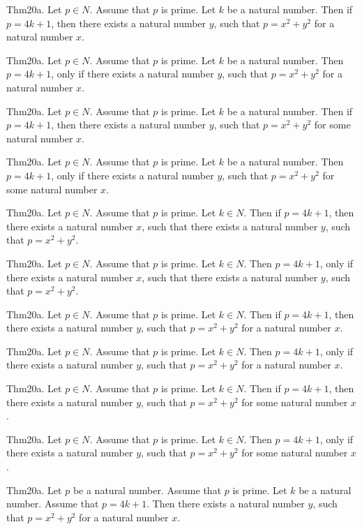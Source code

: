 \documentclass{article}
\begin{document}
Thm20a. Let $p \in N$. Assume that $p$ is prime. Let $k$ be a natural number. Then if $p = 4 k + 1$, then there exists a natural number $y$, such that $p = x ^{ 2}+ y ^{ 2}$ for a natural number $x$.

Thm20a. Let $p \in N$. Assume that $p$ is prime. Let $k$ be a natural number. Then $p = 4 k + 1$, only if there exists a natural number $y$, such that $p = x ^{ 2}+ y ^{ 2}$ for a natural number $x$.

Thm20a. Let $p \in N$. Assume that $p$ is prime. Let $k$ be a natural number. Then if $p = 4 k + 1$, then there exists a natural number $y$, such that $p = x ^{ 2}+ y ^{ 2}$ for some natural number $x$.

Thm20a. Let $p \in N$. Assume that $p$ is prime. Let $k$ be a natural number. Then $p = 4 k + 1$, only if there exists a natural number $y$, such that $p = x ^{ 2}+ y ^{ 2}$ for some natural number $x$.

Thm20a. Let $p \in N$. Assume that $p$ is prime. Let $k \in N$. Then if $p = 4 k + 1$, then there exists a natural number $x$, such that there exists a natural number $y$, such that $p = x ^{ 2}+ y ^{ 2}$.

Thm20a. Let $p \in N$. Assume that $p$ is prime. Let $k \in N$. Then $p = 4 k + 1$, only if there exists a natural number $x$, such that there exists a natural number $y$, such that $p = x ^{ 2}+ y ^{ 2}$.

Thm20a. Let $p \in N$. Assume that $p$ is prime. Let $k \in N$. Then if $p = 4 k + 1$, then there exists a natural number $y$, such that $p = x ^{ 2}+ y ^{ 2}$ for a natural number $x$.

Thm20a. Let $p \in N$. Assume that $p$ is prime. Let $k \in N$. Then $p = 4 k + 1$, only if there exists a natural number $y$, such that $p = x ^{ 2}+ y ^{ 2}$ for a natural number $x$.

Thm20a. Let $p \in N$. Assume that $p$ is prime. Let $k \in N$. Then if $p = 4 k + 1$, then there exists a natural number $y$, such that $p = x ^{ 2}+ y ^{ 2}$ for some natural number $x$.

Thm20a. Let $p \in N$. Assume that $p$ is prime. Let $k \in N$. Then $p = 4 k + 1$, only if there exists a natural number $y$, such that $p = x ^{ 2}+ y ^{ 2}$ for some natural number $x$.

Thm20a. Let $p$ be a natural number. Assume that $p$ is prime. Let $k$ be a natural number. Assume that $p = 4 k + 1$. Then there exists a natural number $y$, such that $p = x ^{ 2}+ y ^{ 2}$ for a natural number $x$.
\end{document}
